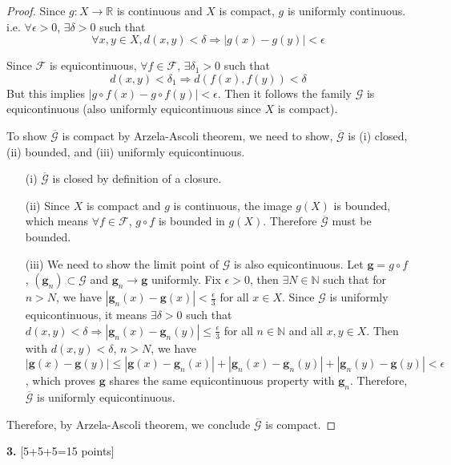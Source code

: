 \documentclass[11pt,a4paper]{amsart}
\def\N{{\mathbb N}}
\def\d{\delta}
\def\e{\epsilon}
\def\RA{\Rightarrow}
\def\ra{\rightarrow}
\begin{document}
\begin{proof}
Since $g:X\ra \mathbb{R}$ is continuous and $X$ is compact, $g$ is uniformly continuous. i.e. $\forall\e>0$, $\exists\d>0$ such that 
$$\forall x,y\in X, d(x,y)<\d \RA |g(x) - g(y)|<\e $$

Since $\mathcal{F}$ is equicontinuous, $\forall f\in\mathcal{F}$, $\exists\d_1>0$ 
such that $$ d(x,y) < \d_1 \RA d(f(x), f(y)) < \d $$
But this implies $|g\circ f(x) - g\circ f(y)|<\e$.
Then it follows the family $\mathcal{G}$ is equicontinuous
(also uniformly equicontinuous since $X$ is compact). 

To show $\overline{\mathcal{G}}$ is compact by Arzela-Ascoli theorem, 
we need to show, $\overline{\mathcal{G}}$ is (i) closed, (ii) bounded, 
and (iii) uniformly equicontinuous. 

\begin{enumerate}
    \item[(i)] $\overline{\mathcal{G}}$ is closed by definition of a closure.
    
    \item[(ii)] Since $X$ is compact and $g$ is continuous, the image $g(X)$ is bounded, 
    which means $\forall f\in\mathcal{F}$, $g\circ f$ is bounded in $g(X)$.
    Therefore $\overline{\mathcal{G}}$ must be bounded.
    
    \item[(iii)] We need to show the limit point of $\mathcal{G}$ is also equicontinuous.
    Let $\bm g = g\circ f$, $(\bm g_n) \subset \mathcal{G}$ and $\bm g_n \to \bm g$ uniformly. Fix $\e>0$, then $\exists N\in\N$ such that for $n>N$, we have 
    $|\bm g_n (x) - \bm g (x)| < \frac{\e}{3}$ for all $x\in X$.
    Since $\mathcal{G}$ is uniformly equicontinuous, it means 
    $\exists\d>0$ such that $ d(x,y)<\d \RA |\bm g_n(x) - \bm g_n(y)| \le \frac{\e}{3}$ 
    for all $n\in\N$ and all $x,y\in X$. Then with $d(x,y)<\d$, $n>N$, we have
    $|\bm g(x) - \bm g(y)| \le |\bm g(x) - \bm g_n(x)| + |\bm g_n(x) - \bm g_n(y)| + |\bm g_n(y) - \bm g(y)| < \e$, which proves $\bm g$ shares the same equicontinuous property with $\bm g_n$. Therefore, $\overline{\mathcal{G}}$ is uniformly equicontinuous. 
\end{enumerate}

Therefore, by Arzela-Ascoli theorem, we conclude $\overline{\mathcal{G}}$ is compact.
\end{proof}


\bigskip



{\bf 3.} [5+5+5=15 points]
\end{document}
